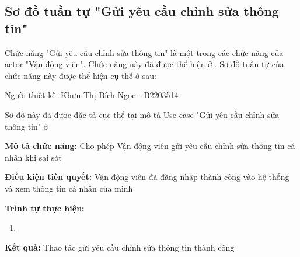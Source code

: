 \subsection{Sơ đồ tuần tự "Gửi yêu cầu chỉnh sửa thông tin"}
\setcounter{figure}{0}

Chức năng "Gửi yêu cầu chỉnh sửa thông tin" là một trong các chức năng của actor "Vận động viên".
Chức năng này đã được thể hiện ở .
Sơ đồ tuần tự của chức năng này được thể hiện cụ thể ở \myref{} sau:

Người thiết kế: Khưu Thị Bích Ngọc - B2203514

Sơ đồ này đã được đặc tả cục thể tại mô tả Use case
"Gửi yêu cầu chỉnh sửa thông tin" ở 

\noindent
\textbf{Mô tả chức năng:} Cho phép Vận động viên gửi yêu cầu chỉnh sửa thông tin cá nhân khi sai sót

\noindent
\textbf{Điều kiện tiên quyết:} Vận động viên đã đăng nhập thành công vào hệ thống và xem thông tin cá nhân của mình

\noindent
\textbf{Trình tự thực hiện:}

\noindent
\begin{enumerate}
  \item
\end{enumerate}

\noindent
\textbf{Kết quả:} Thao tác gửi yêu cầu chỉnh sửa thông tin thành công

